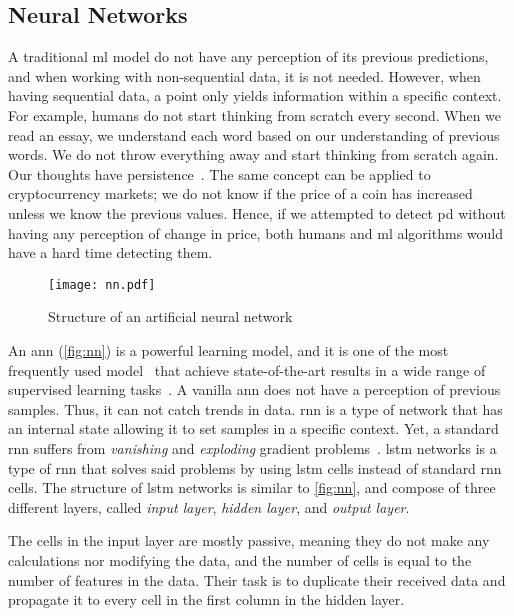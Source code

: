 \subsection{Neural Networks}\label{sec:nn}
A traditional \ac{ml} model do not have any perception of its previous predictions, and when working with non-sequential data, it is not needed. However, when having sequential data, a point only yields information within a specific context. For example, humans do not start thinking from scratch every second. When we read an essay, we understand each word based on our understanding of previous words. We do not throw everything away and start thinking from scratch again. Our thoughts have persistence~\cite{colah}. The same concept can be applied to cryptocurrency markets; we do not know if the price of a coin has increased unless we know the previous values. Hence, if we attempted to detect \ac{pd} without having any perception of change in price, both humans and \ac{ml} algorithms would have a hard time detecting them.

\begin{figure}
    \centering
    \texttt{[image: nn.pdf]}
    \caption[Architecture - \Acf{ann}]{Structure of an artificial neural network}
    \label{fig:nn}
\end{figure}

An \ac{ann} (\autoref{fig:nn}) is a powerful learning model, and it is one of the most frequently used model~\cite{hunt1992neural} that achieve state-of-the-art results in a wide range of supervised learning tasks~\cite{lipton2015critical}. A vanilla \ac{ann} does not have a perception of previous samples. Thus, it can not catch trends in data. \ac{rnn} is a type of network that has an internal state allowing it to set samples in a specific context. Yet, a standard \ac{rnn} suffers from \emph{vanishing} and \emph{exploding} gradient problems~\cite{bengio1994learning}. \ac{lstm} networks is a type of \ac{rnn} that solves said problems by using \ac{lstm} cells instead of standard \ac{rnn} cells. The structure of \ac{lstm} networks is similar to \autoref{fig:nn}, and compose of three different layers, called \emph{input layer}, \emph{hidden layer}, and \emph{output layer}.

The cells in the input layer are mostly passive, meaning they do not make any calculations nor modifying the data, and the number of cells is equal to the number of features in the data. Their task is to duplicate their received data and propagate it to every cell in the first column in the hidden layer.

